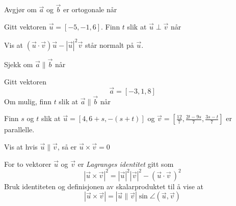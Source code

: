 \nes
{}
Avgjør om $ \vec{a} $ og $ \vec{b} $ er ortogonale når



Gitt vektoren $\vec{u}=[-5, -1, 6]$. Finn $ t $ slik at $ \vec{u}\perp \vec{v} $ når\os
{}

Vis at $(\vec{u}\cdot\vec{v})\vec{u}-|\vec{u}|^2\vec{v}$ står normalt på $\vec{u}$.


Sjekk om $ \vec{a}\parallel\vec{b} $ når\os
{}
 
\newpage
{}
Gitt vektoren 
\[ \vec{a}=[-3, 1, 8] \]
Om mulig, finn $ t $ slik at $ \vec{a}\parallel\vec{b} $ når \os
{}



Finn $ s $ og $ t $ slik at $\vec{u}=[4, 6+s, -(s+t)] $ og $ \vec{v}=\left[\frac{12}{7}, \frac{2t-9s}{7}, \frac{3s-t}{7}\right] $ er parallelle. \os

\nes

Vis at hvis $ \vec{u}\parallel\vec{v} $, så er $ \vec{u}\times\vec{v}=0 $

For to vektorer $ \vec{u} $ og $ \vec{v} $ er \textit{Lagranges identitet} gitt som
\[ |\vec{u}\times\vec{v}|^2=|\vec{u}|^2|\vec{v}|^2-(\vec{u}\cdot\vec{v}\,)^2 \]
Bruk identiteten og definisjonen av skalarproduktet til å vise at
\[ |\vec{u}\times\vec{v}|=|\vec{u}\parallel\vec{v}|\sin \angle(\vec{u}, \vec{v})  \]\vs

